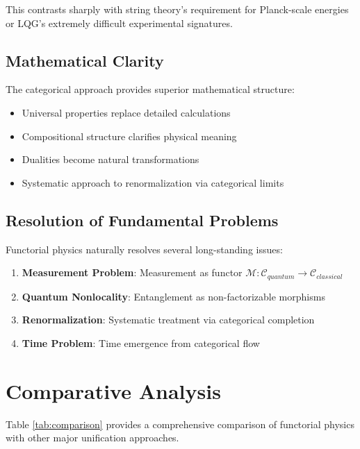 \documentclass[11pt,a4paper]{article}
\begin{document}
This contrasts sharply with string theory's requirement for Planck-scale energies or LQG's extremely difficult experimental signatures.

\subsection{Mathematical Clarity}

The categorical approach provides superior mathematical structure:

\begin{itemize}
    \item Universal properties replace detailed calculations
    \item Compositional structure clarifies physical meaning
    \item Dualities become natural transformations
    \item Systematic approach to renormalization via categorical limits
\end{itemize}

\subsection{Resolution of Fundamental Problems}

Functorial physics naturally resolves several long-standing issues:

\begin{enumerate}
    \item \textbf{Measurement Problem}: Measurement as functor $\mathcal{M}: \mathcal{C}_{quantum} \to \mathcal{C}_{classical}$
    \item \textbf{Quantum Nonlocality}: Entanglement as non-factorizable morphisms
    \item \textbf{Renormalization}: Systematic treatment via categorical completion
    \item \textbf{Time Problem}: Time emergence from categorical flow
\end{enumerate}

\section{Comparative Analysis}

Table \ref{tab:comparison} provides a comprehensive comparison of functorial physics with other major unification approaches.
\end{document}

